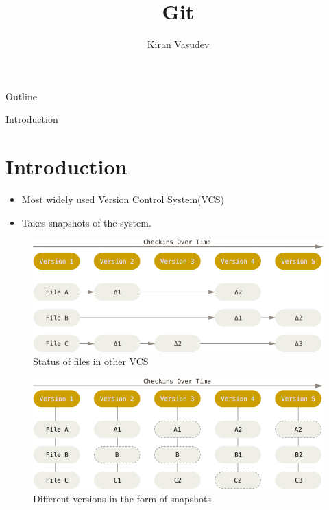 \documentclass{beamer}
\title{Git}
\author{Kiran Vasudev\inst{1}}
\institute[] 
{
  \inst{1}
  Hochschule Bonn-Rhein-Sieg

}
\begin{document}
\begin{frame}
  \titlepage
\end{frame}

\begin{frame}{Outline}
  \tableofcontents
\end{frame}

\begin{frame}[allowframebreaks]{Introduction}
\section{Introduction}
  \begin{itemize}
  \item {
    Most widely used Version Control System(VCS)
  }
  \item {
    Takes snapshots of the system.
  }
  \end{itemize}
\begin{figure}
	\includegraphics[scale=0.4]{images/deltas}
	\caption{Status of files in other VCS\cite{git-basics}}
\end{figure}
\begin{figure}
	\includegraphics[scale=0.4]{images/git}
	\caption{Different versions in the form of snapshots\cite{git-basics}}
\end{figure}
\end{frame}
\end{document}
